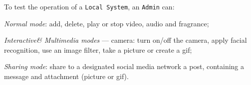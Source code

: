 To test the operation of a \texttt{Local System}, an \texttt{Admin} can:
\begin{item-c}
\item \emph{Normal mode}: add, delete, play or stop video, audio and fragrance;
\item \emph{Interactive\& Multimedia modes} --- camera: turn on/off the camera, apply facial
  recognition, use an image filter, take a picture or create a \gls{gif};
\item \emph{Sharing mode}: share to a designated social media network a post,
  containing a message and attachment (picture or \gls{gif}). 
\end{item-c}
%
%
%

